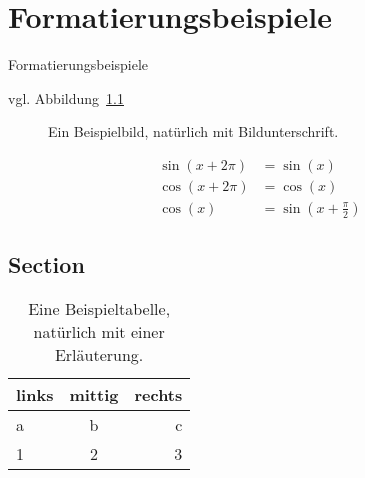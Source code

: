 \chapter{Formatierungsbeispiele}

Formatierungsbeispiele

vgl. Abbildung~\ref{fig:beispiel}

\begin{figure}[ht]
  \centering
  \caption{Ein Beispielbild, natürlich mit Bildunterschrift.}
  \label{fig:beispiel}
\end{figure}




\begin{align}
  \sin(x+2\pi) &= \sin(x)\\
  \cos(x+2\pi) &= \cos(x)\\
  \cos(x) &= \sin\left(x+\frac{\pi}{2}\right)
\end{align}


\section{Section}

\begin{table}
  \centering
  \begin{tabular}{l|c|r}
	links & mittig & rechts\\\hline
	a & b & c\\
	1 & 2 & 3  
  \end{tabular}
  \caption{Eine Beispieltabelle, natürlich mit einer Erläuterung.}
  \label{tab:beispiel}
\end{table}
